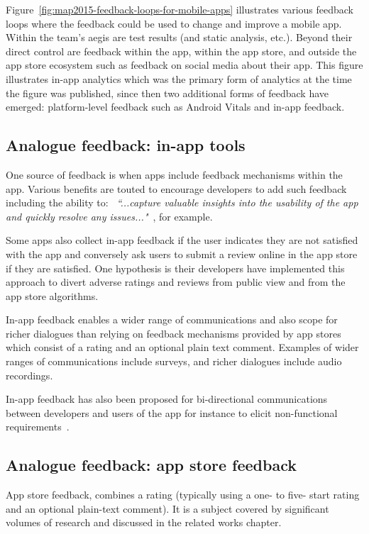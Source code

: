 Figure~\ref{fig:map2015-feedback-loops-for-mobile-apps} illustrates various feedback loops where the feedback could be used to change and improve a mobile app. Within the team's aegis are test results (and static analysis, etc.). Beyond their direct control are feedback within the app, within the app store, and outside the app store ecosystem such as feedback on social media about their app. This figure illustrates in-app analytics which was the primary form of analytics at the time the figure was published, since then two additional forms of feedback have emerged: platform-level feedback such as Android Vitals and in-app feedback.

\subsection{Analogue feedback: in-app tools}
One source of feedback is when apps include feedback mechanisms within the app. Various benefits are touted to encourage developers to add such feedback including the ability to: ~\emph{``...capture valuable insights into the usability of the app and quickly resolve any issues..."}~, for example. 

Some apps also collect in-app feedback if the user indicates they are not satisfied with the app and conversely ask users to submit a review online in the app store if they are satisfied. One hypothesis is their developers have implemented this approach to divert adverse ratings and reviews from public view and from the app store algorithms. 

In-app feedback enables a wider range of communications and also scope for richer dialogues than relying on feedback mechanisms provided by app stores which consist of a rating and an optional plain text comment. Examples of wider ranges of communications include surveys, and richer dialogues include audio recordings.

In-app feedback has also been proposed for bi-directional communications between developers and users of the app for instance to elicit non-functional requirements~.

\subsection{Analogue feedback: app store feedback}
App store feedback, combines a rating (typically using a one- to five- start rating and an optional plain-text comment). It is a subject covered by significant volumes of research and discussed in the related works chapter. %

